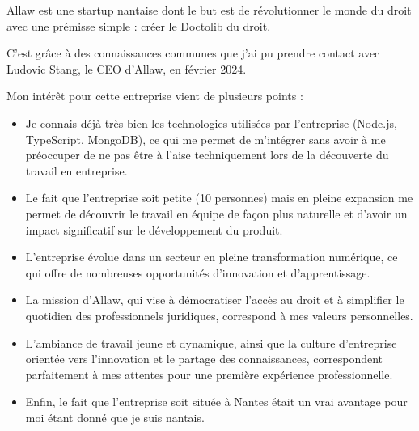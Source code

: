 Allaw est une startup nantaise dont le but est de révolutionner le monde du droit
avec une prémisse simple : créer le Doctolib du droit.

C'est grâce à des connaissances communes que j'ai pu prendre contact avec Ludovic Stang,
le CEO d'Allaw, en février 2024.

Mon intérêt pour cette entreprise vient de plusieurs points :
\begin{itemize}
  \item Je connais déjà très bien les technologies utilisées par l'entreprise
        (Node.js, TypeScript, MongoDB),
        ce qui me permet de m'intégrer sans avoir à me préoccuper de ne pas
        être à l'aise techniquement lors de la découverte du travail en entreprise.
  \item Le fait que l'entreprise soit petite (10 personnes) mais en pleine expansion
        me permet de découvrir le travail en équipe de façon plus naturelle et
        d'avoir un impact significatif sur le développement du produit.
  \item L'entreprise évolue dans un secteur en pleine transformation numérique,
        ce qui offre de nombreuses opportunités d'innovation et d'apprentissage.
  \item La mission d'Allaw, qui vise à démocratiser l'accès au droit et à
        simplifier le quotidien des professionnels juridiques, correspond à
        mes valeurs personnelles.
  \item L'ambiance de travail jeune et dynamique, ainsi que la culture d'entreprise
        orientée vers l'innovation et le partage des connaissances, correspondent
        parfaitement à mes attentes pour une première expérience professionnelle.
  \item Enfin, le fait que l'entreprise soit située à Nantes était un vrai
        avantage pour moi étant donné que je suis nantais.
\end{itemize}

